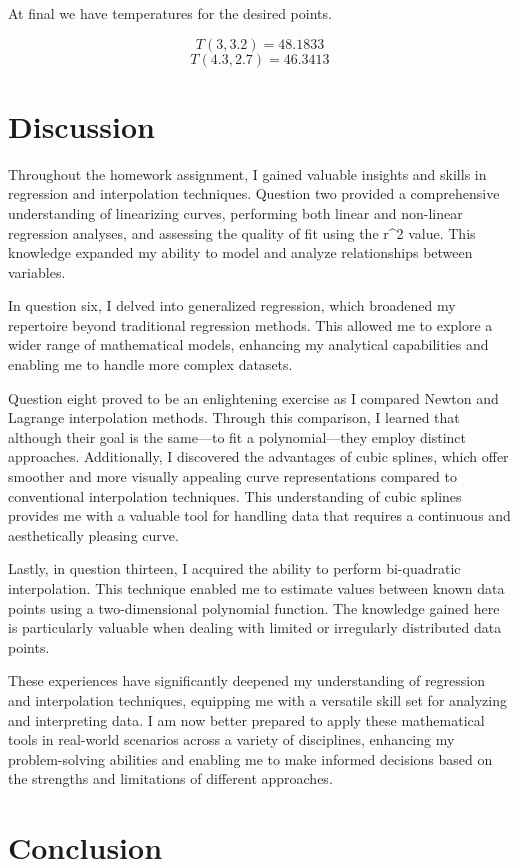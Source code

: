 \documentclass[12pt, a4paper]{article}
\numberwithin{equation}{section}
\begin{document}
At final we have temperatures for the desired points.

$$ T(3, 3.2) = 48.1833$$
$$ T(4.3, 2.7) = 46.3413$$

\newpage
\section{Discussion}
Throughout the homework assignment, I gained valuable insights and skills in regression and interpolation techniques. Question two provided a comprehensive understanding of linearizing curves, performing both linear and non-linear regression analyses, and assessing the quality of fit using the r^2 value. This knowledge expanded my ability to model and analyze relationships between variables.

In question six, I delved into generalized regression, which broadened my repertoire beyond traditional regression methods. This allowed me to explore a wider range of mathematical models, enhancing my analytical capabilities and enabling me to handle more complex datasets.

Question eight proved to be an enlightening exercise as I compared Newton and Lagrange interpolation methods. Through this comparison, I learned that although their goal is the same—to fit a polynomial—they employ distinct approaches. Additionally, I discovered the advantages of cubic splines, which offer smoother and more visually appealing curve representations compared to conventional interpolation techniques. This understanding of cubic splines provides me with a valuable tool for handling data that requires a continuous and aesthetically pleasing curve.

Lastly, in question thirteen, I acquired the ability to perform bi-quadratic interpolation. This technique enabled me to estimate values between known data points using a two-dimensional polynomial function. The knowledge gained here is particularly valuable when dealing with limited or irregularly distributed data points.

These experiences have significantly deepened my understanding of regression and interpolation techniques, equipping me with a versatile skill set for analyzing and interpreting data. I am now better prepared to apply these mathematical tools in real-world scenarios across a variety of disciplines, enhancing my problem-solving abilities and enabling me to make informed decisions based on the strengths and limitations of different approaches.

\section{Conclusion}
\end{document}
